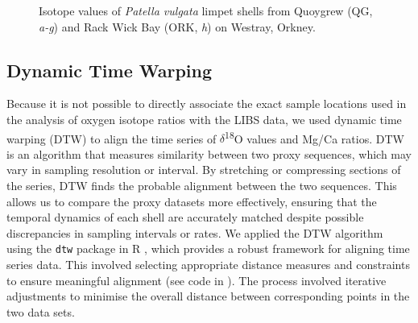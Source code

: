 \documentclass[
  authoryear,
  preprint,
  3p]{elsarticle}
\begin{document}
\begin{figure}[H]


\caption{\label{fig-Pat_iso}Isotope values of \emph{Patella vulgata}
limpet shells from Quoygrew (QG, \emph{a-g}) and Rack Wick Bay (ORK,
\emph{h}) on Westray, Orkney.}

\end{figure}%

\subsection{Dynamic Time Warping}\label{dynamic-time-warping}

Because it is not possible to directly associate the exact sample
locations used in the analysis of oxygen isotope ratios with the LIBS
data, we used dynamic time warping (DTW) to align the time series of
\(\delta\)\textsuperscript{18}O values and Mg/Ca ratios. DTW is an
algorithm that measures similarity between two proxy sequences, which
may vary in sampling resolution or interval. By stretching or
compressing sections of the series, DTW finds the probable alignment
between the two sequences. This allows us to compare the proxy datasets
more effectively, ensuring that the temporal dynamics of each shell are
accurately matched despite possible discrepancies in sampling intervals
or rates. We applied the DTW algorithm using the \texttt{dtw} package in
R \citep{Giorgino2009-sj, R_Core_Team2020-mk}, which provides a robust
framework for aligning time series data. This involved selecting
appropriate distance measures and constraints to ensure meaningful
alignment (see code in \citep{Hausmann_2024OSF}). The process involved
iterative adjustments to minimise the overall distance between
corresponding points in the two data sets.
\end{document}
